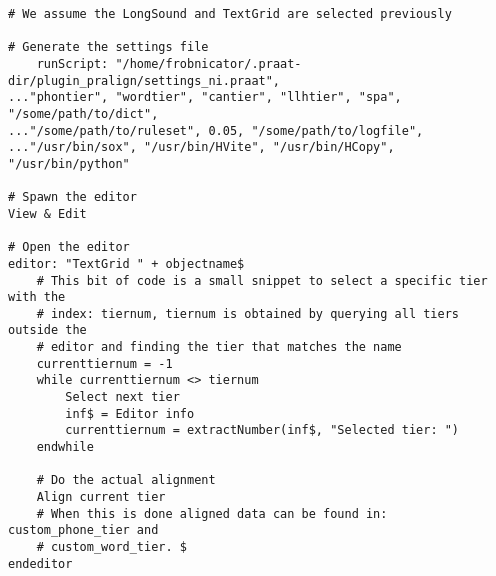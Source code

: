 \begin{lstlisting}[caption={Example scriptability},label={lis:scriptab}]
# We assume the LongSound and TextGrid are selected previously

# Generate the settings file
	runScript: "/home/frobnicator/.praat-dir/plugin_pralign/settings_ni.praat",
..."phontier", "wordtier", "cantier", "llhtier", "spa", "/some/path/to/dict",
..."/some/path/to/ruleset", 0.05, "/some/path/to/logfile",
..."/usr/bin/sox", "/usr/bin/HVite", "/usr/bin/HCopy", "/usr/bin/python"

# Spawn the editor
View & Edit

# Open the editor
editor: "TextGrid " + objectname$
	# This bit of code is a small snippet to select a specific tier with the
	# index: tiernum, tiernum is obtained by querying all tiers outside the
	# editor and finding the tier that matches the name
	currenttiernum = -1
	while currenttiernum <> tiernum
		Select next tier
		inf$ = Editor info
		currenttiernum = extractNumber(inf$, "Selected tier: ")
	endwhile
	
	# Do the actual alignment
	Align current tier
	# When this is done aligned data can be found in: custom_phone_tier and 
	# custom_word_tier. $
endeditor
\end{lstlisting}

